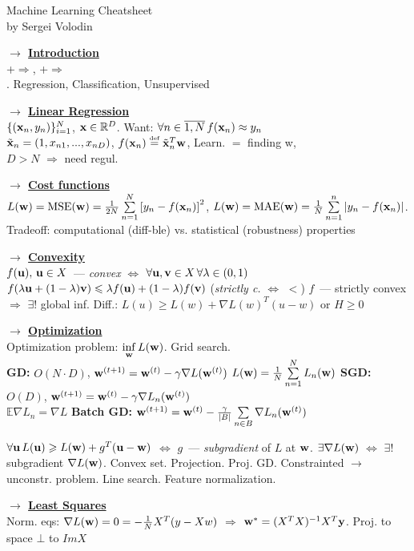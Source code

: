 \documentclass[11pt]{article}
\newcommand{\myvector}[1]{{\bf{#1}}}
\newcommand{\x}{\myvector{x}}
\newcommand{\w}{\myvector{w}}
\newcommand{\uu}{\myvector{u}}
\newcommand{\vv}{\myvector{v}}
\newcommand{\eqdef}{\overset{\mbox{\tiny{def}}}{=}}
\newcommand{\mytitle}[1]{ {\bf $\rightarrow$ \underline{#1}}\\}
\begin{document}
\begin{center}
	{\large Machine Learning Cheatsheet}\\
	by Sergei Volodin
\end{center}
\begin{multicols*}{2}
\mytitle{Introduction}
+$\Rightarrow$, 
+$\Rightarrow$\\. Regression, Classification, Unsupervised

\mytitle{Linear Regression}
$\{(\x_n, y_n)\}_{i=1}^N$, $\x\in \mathbb{R}^D$. Want: $\forall n\in\overline{1, N}\,f(\x_n)\approx y_n$\\
$\tilde{\x}_n=(1,x_{n1},...,x_{nD})$, $f(\x_n)\eqdef \tilde{\x}_n^T\w$, Learn. $=$ finding w,\\
$D>N$ $\Rightarrow$ need regul.

\mytitle{Cost functions}
$L(\w)=\mbox{MSE}(\w)=\frac{1}{2N}\sum\limits_{n=1}^N\left[y_n-f(\x_n)\right]^2$,
$L(\w)=\mbox{MAE}(\w)=\frac{1}{N}\sum\limits_{n=1}^n\left|y_n-f(\x_n)\right|$. Tradeoff: computational (diff-ble) vs. statistical (robustness) properties

\mytitle{Convexity}
$f(\uu),\,\uu\in X$~--- {\em convex} $\Leftrightarrow$
$\forall \uu, \vv\in X\,\forall \lambda\in \left(0,1\right)$\\
$f(\lambda \uu + (1-\lambda) \vv)\leqslant \lambda f(\uu)+(1-\lambda)f(\vv)$ ({\em strictly c.} $\Leftrightarrow$ $<$)
$f$~--- strictly convex $\Rightarrow$ $\exists !$ global inf. Diff.: $L(u)\geqslant L(w)+\nabla L(w)^T(u-w)$ or $H\geqslant 0$

\mytitle{Optimization}
Optimization problem:
$\inf\limits_{\w}L(\w)$. Grid search.\\
{\bf GD:} $O(N\cdot D)$, $\w^{(t+1)}=\w^{(t)}-\gamma\nabla L(\w^{(t)})$ $L(\w)=\frac{1}{N}\sum\limits_{n=1}^N L_n(\w)$ {\bf SGD:} $O(D)$, $\w^{(t+1)}=\w^{(t)}-\gamma\nabla L_n(\w^{(t)})$\\
$\mathbb{E}\nabla L_n=\nabla L$ {\bf Batch GD:}  $\w^{(t+1)}=\w^{(t)}-\frac{\gamma}{|B|} \sum\limits_{n\in B}\nabla L_n(\w^{(t)})$

$\forall\uu\,L(\uu)\geqslant L(\w)+g^T(\uu-\w)$ $\Leftrightarrow$ $g$~--- {\em subgradient} of $L$ at $\w$. $\exists \nabla L(\w)$ $\Leftrightarrow$
$\exists!$ subgradient $\nabla L(\w)$. Convex set. Projection. Proj. GD. Constrainted $\rightarrow$ unconstr. problem. Line search. Feature normalization. 

\mytitle{Least Squares}
Norm. eqs: $\nabla L(\w)=0=-\frac{1}{N}X^T(y-Xw)$
$\Rightarrow$ $\w^*=(X^TX)^{-1}X^T\myvector{y}$.
Proj. to space $\bot$ to $ImX$


\end{multicols*}
\end{document}
